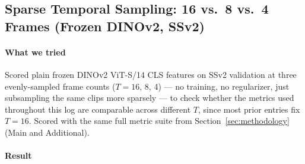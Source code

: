 \subsection{Sparse Temporal Sampling: 16 vs.\ 8 vs.\ 4 Frames (Frozen DINOv2, SSv2)}
\label{exp:sparse-temporal-sampling}

\paragraph{What we tried} Scored plain frozen DINOv2 ViT-S/14 CLS features on SSv2
validation at three evenly-sampled frame counts ($T=16$, 8, 4) --- no training, no
regularizer, just subsampling the same clips more sparsely --- to check whether the
metrics used throughout this log are comparable across different $T$, since most prior
entries fix $T=16$. Scored with the same full metric suite from
Section~\ref{sec:methodology} (Main and Additional).

\paragraph{Result}

